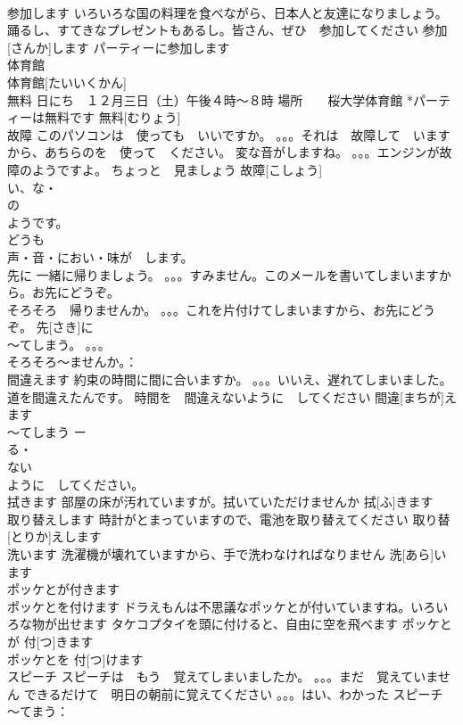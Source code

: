 \documentclass[8pt]{extreport}
\begin{document}
\begin{CJK}{UTF8}{min}
\\	参加します	いろいろな国の料理を食べながら、日本人と友達になりましょう。 踊るし、すてきなプレゼントもあるし。皆さん、ぜひ　参加してください	参加[さんか]します				パーティーに参加します	
\\	体育館	
\\	体育館[たいいくかん]					
\\	無料	日にち　１２月三日（土）午後４時～８時 場所　　桜大学体育館 *パーティーは無料です	無料[むりょう]					
\\	故障	このパソコンは　使っても　いいですか。 。。。それは　故障して　いますから、あちらのを　使って　ください。 変な音がしますね。 。。。エンジンが故障のようですよ。 ちょっと　見ましょう	故障[こしょう]				
\\	い、な・
\\	の
\\	ようです。
\\	どうも
\\	声・音・におい・味が　します。
\\	先に	一緒に帰りましょう。 。。。すみません。このメールを書いてしまいますから。お先にどうぞ。 
\\	そろそろ　帰りませんか。 。。。これを片付けてしまいますから、お先にどうぞ。	先[さき]に			
\\	～てしまう。 。。。
\\	そろそろ～ませんか。：
\\	間違えます	約束の時間に間に合いますか。 。。。いいえ、遅れてしまいました。道を間違えたんです。 時間を　間違えないように　してください	間違[まちが]えます			
\\	～てしまう ー
\\	る・
\\	ない
\\	ように　してください。
\\	拭きます	部屋の床が汚れていますが。拭いていただけませんか	拭[ふ]きます					
\\	取り替えします	時計がとまっていますので、電池を取り替えてください	取り替[とりか]えします			
\\	洗います	洗濯機が壊れていますから、手で洗わなければなりません	洗[あら]います					
\\	ポッケとが付きます　
\\	ポッケとを付けます	ドラえもんは不思議なポッケとが付いていますね。いろいろな物が出せます タケコプタイを頭に付けると、自由に空を飛べます	ポッケとが 付[つ]きます　
\\	ポッケとを 付[つ]けます					
\\	スピーチ	スピーチは　もう　覚えてしまいましたか。 。。。まだ　覚えていません できるだけて　明日の朝前に覚えてください 。。。はい、わかった	スピーチ				～てまう：

\end{CJK}
\end{document}
